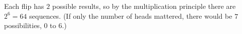 Each flip has $2$ possible results, so by the multiplication principle there are $2^6=\boxed{64}$ sequences. (If only the number of heads mattered, there would be $7$ possibilities, $0$ to $6$.)
